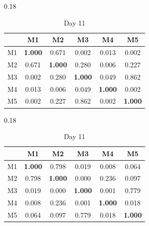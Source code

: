 \begin{table}[htbp]
\begin{subtable}[t]{0.18\linewidth}
\centering
\caption*{Day 10}
\begin{tabular}{cccccc}
\toprule
& M1 & M2 & M3 & M4 & M5 \\
\midrule
M1 & \textbf{1.000} & 0.671 & 0.002 & 0.013 & 0.002 \\
M2 & 0.671 & \textbf{1.000} & 0.280 & 0.006 & 0.227 \\
M3 & 0.002 & 0.280 & \textbf{1.000} & 0.049 & 0.862 \\
M4 & 0.013 & 0.006 & 0.049 & \textbf{1.000} & 0.002 \\
M5 & 0.002 & 0.227 & 0.862 & 0.002 & \textbf{1.000} \\
\bottomrule
\end{tabular}
\end{subtable}
\hfill
\begin{subtable}[t]{0.18\linewidth}
\centering
\caption*{Day 11}
\begin{tabular}{cccccc}
\toprule
& M1 & M2 & M3 & M4 & M5 \\
\midrule
M1 & \textbf{1.000} & 0.798 & 0.019 & 0.008 & 0.064 \\
M2 & 0.798 & \textbf{1.000} & 0.000 & 0.236 & 0.097 \\
M3 & 0.019 & 0.000 & \textbf{1.000} & 0.001 & 0.779 \\
M4 & 0.008 & 0.236 & 0.001 & \textbf{1.000} & 0.018 \\
M5 & 0.064 & 0.097 & 0.779 & 0.018 & \textbf{1.000} \\
\bottomrule
\end{tabular}
\end{subtable}
\hfill
\end{table}